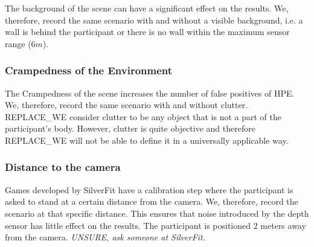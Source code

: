 The background of the scene can have a significant effect on the results. We, therefore, record the same scenario with and without a visible background, i.e. a wall is behind the participant or there is no wall within the maximum sensor range ($6m$).

\subsubsection{Crampedness of the Environment}

The Crampedness of the scene increases the number of false positives of HPE. We, therefore, record the same scenario with and without clutter. REPLACE_WE consider clutter to be any object that is not a part of the participant's body. However, clutter is quite objective and therefore REPLACE_WE will not be able to define it in a universally applicable way. 

\subsubsection{Distance to the camera}

Games developed by SilverFit have a calibration step where the participant is asked to stand at a certain distance from the camera. We, therefore, record the scenario at that specific distance. This ensures that noise introduced by the depth sensor has little effect on the results. The participant is positioned 2 meters away from the camera. \textit{UNSURE, ask someone at SilverFit}.


